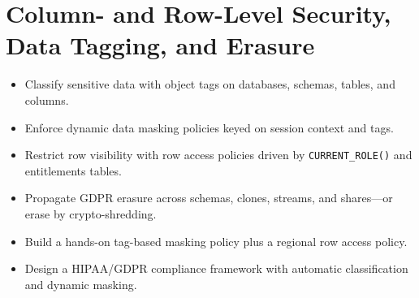 \chapter{Column- and Row-Level Security, Data Tagging, and Erasure}
%
\begin{objectives}
\begin{itemize}
    \item Classify sensitive data with object tags on databases, schemas, tables, and columns.
    \item Enforce dynamic data masking policies keyed on session context and tags.
    \item Restrict row visibility with row access policies driven by \texttt{CURRENT\_ROLE()} and entitlements tables.
    \item Propagate GDPR erasure across schemas, clones, streams, and shares---or erase by crypto-shredding.
    \item Build a hands-on tag-based masking policy plus a regional row access policy.
    \item Design a HIPAA/GDPR compliance framework with automatic classification and dynamic masking.
\end{itemize}
\end{objectives}

